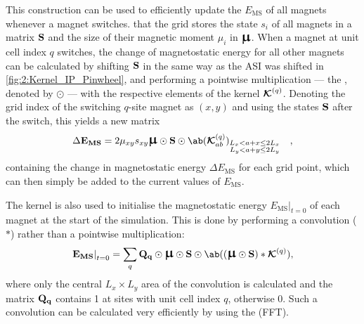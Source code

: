 This construction can be used to efficiently update the  $E_\mathrm{MS}$ of all magnets whenever a magnet switches.
 that the grid stores the state $s_i$ of all magnets in a matrix $\boldsymbol{\mathbf{S}}$ and the size of their magnetic moment $\mu_i$ in $\vc{\bigmu}$.
When a magnet at unit cell index $q$ switches, the change of magnetostatic energy for all other magnets can be calculated by shifting $\boldsymbol{\mathbf{S}}$ in the same way as the ASI was shifted in \cref{fig:2:Kernel_IP_Pinwheel}, and performing a pointwise multiplication --- the , denoted by $\odot$ --- with the respective elements of the kernel $\boldsymbol{\mathbf{\mathcal{K}}}^{(q)}$.
Denoting the grid index of the switching $q$-site magnet as $(x,y)$ and using the states $\boldsymbol{\mathbf{S}}$ after the switch, this yields a new matrix
\begin{equation}
	\label{eq:2:Kernel_update}
	\Delta \vc{E_\mathrm{MS}} = 2\mu_{xy} s_{xy}\vc{\bigmu} \odot \vc{S} \odot \ab(\vc{\mathcal{K}}^{(q)}_{ab})_{\substack{L_x < a + x \leq 2L_x \\ L_y < a + y \leq 2L_y}} \quad\mathrm{,}
\end{equation}
containing the change in magnetostatic energy $\Delta E_\mathrm{MS}$ for each grid point, which can then simply be added to the current values of $E_\mathrm{MS}$. \par
The kernel is also used to initialise the magnetostatic energy $\left. E_\mathrm{MS} \right|_{t=0}$ of each magnet at the start of the simulation.
This is done by performing a convolution ($*$) rather than a pointwise multiplication:
\begin{equation}
	\label{eq:2:Kernel_init}
	\left. \vc{E_\mathrm{MS}} \right|_{t=0} = \sum_q \vc{Q_q} \odot \vc{\bigmu} \odot \vc{S} \odot \ab((\vc{\bigmu} \odot \vc{S}) * \vc{\mathcal{K}}^{(q)}) \mathrm{,}
\end{equation}
where only the central $L_x \times L_y$ area of the convolution is calculated and the matrix $\boldsymbol{\mathbf{Q_q}}$ contains 1 at sites with unit cell index $q$, otherwise 0.
Such a convolution can be calculated very efficiently by using the  (FFT). \\\par

